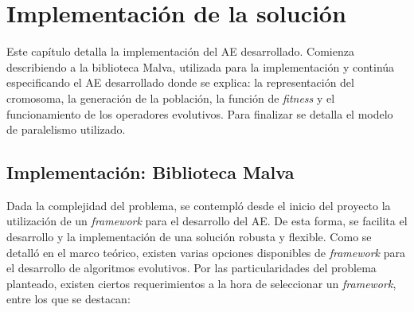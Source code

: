 \chapter{Implementación de la solución}

Este capítulo detalla la implementación del AE desarrollado. Comienza describiendo a la biblioteca Malva, utilizada para la implementación y continúa especificando el AE desarrollado donde se explica: la representación del cromosoma, la generación de la población, la función de \emph{fitness} y el funcionamiento de los operadores evolutivos. Para finalizar se detalla el modelo de paralelismo utilizado.

\section{Implementación: Biblioteca Malva}

Dada la complejidad del problema, se contempló desde el inicio del proyecto la utilización de un \emph{framework} para el desarrollo del AE. De esta forma, se facilita el desarrollo y la implementación de una solución robusta y flexible. Como se detalló en el marco teórico, existen varias opciones disponibles de \emph{framework} para el desarrollo de algoritmos evolutivos. Por las particularidades del problema planteado, existen ciertos requerimientos a la hora de seleccionar un \emph{framework}, entre los que se destacan:

